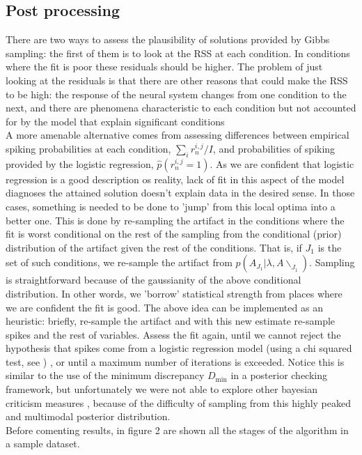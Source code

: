 \documentclass[12pt,letterpaper,fleqn]{article}
\begin{document}
\subsection{Post processing}
There are two ways to assess the plausibility of solutions provided by Gibbs sampling: the first of them is to look at the RSS at each condition. In conditions where the fit is poor these residuals should be higher. The problem of just looking at the residuals is that there are other reasons that could make the RSS to be high: the response of the neural system changes from one condition to the next, and there are phenomena characteristic to each condition but not  accounted for by the model that explain significant conditions\\ A more amenable alternative comes from assessing differences between empirical spiking probabilities at each condition, $\sum_i r_n^{i,j}/I$, and probabilities of spiking provided by the logistic regression, $\hat{p}(r_n^{i,j}=1)$. As we are confident that logistic regression is a good description os reality, lack of fit in this aspect of the model diagnoses the attained solution doesn't explain data in the desired sense. In those cases, something is needed to be done to 'jump' from this local optima into a better one. This is done by re-sampling the artifact in the conditions where the fit is worst conditional on the rest of the  sampling from the conditional (prior) distribution of the artifact given the rest of the conditions. That is, if $J_1$ is the set of such conditions, we re-sample the artifact from $p(A_{J_1}|\lambda,A\backslash_{J_1})$. Sampling is straightforward because of the gaussianity of the above conditional distribution. In other words, we 'borrow' statistical strength from places where we are confident the fit is good. The above idea can be implemented as an heuristic: briefly, re-sample the artifact and with this new estimate re-sample spikes and the rest of variables. Assess the fit again, until we cannot reject the hypothesis that spikes come from a logistic regression model (using a chi squared test, see \cite{Hosmer1997}) , or until a maximum number of iterations is exceeded. Notice this is similar to the use of the minimum discrepancy $D_{\min}$ \cite{Gelman96posteriorpredictive} in a posterior checking framework, but unfortunately we were not able to explore other bayesian criticism measures \cite{Box1980}, because of the difficulty of sampling from this highly peaked and multimodal posterior distribution. 
\\Before comenting results, in figure 2 are shown all the stages of the algorithm in a sample dataset.
\end{document}
